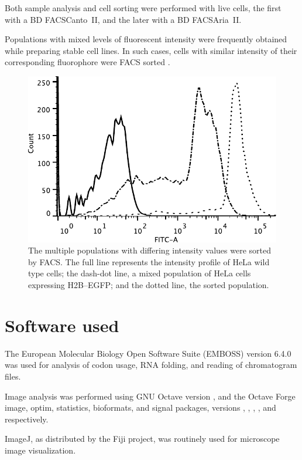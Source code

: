      Both sample analysis and cell sorting were performed with live cells, the
      first with a BD FACSCanto~II, and the later with a BD FACSAria~II.

      Populations with mixed levels of fluorescent intensity were
      frequently obtained while preparing stable cell lines. In such
      cases, cells with similar intensity of their corresponding
      fluorophore were FACS sorted .

      \begin{figure}
        \centering
        \includegraphics[width=\textwidth]{figs/facs-stable-cell-lines.pdf}
                     { The multiple populations with differing
                       intensity values were sorted by FACS. The full
                       line represents the intensity profile of HeLa
                       wild type cells; the dash-dot line, a mixed
                       population of HeLa cells expressing H2B--EGFP;
                       and the dotted line, the sorted population.  }
        \label{fig:methods:facs}
      \end{figure}

  \section{Software used}
    \label{sec:methods:software}
    The European Molecular Biology Open Software Suite (EMBOSS) version 6.4.0
    was used for analysis of codon usage, RNA folding, and reading of
    chromatogram files.

    Image analysis was performed using GNU Octave version \OctaveVersion{},
    and the Octave Forge image, optim, statistics, bioformats, and signal
    packages, versions \OctaveImageVersion{}, \OctaveOptimVersion{},
    \OctaveStatisticsVersion{}, \OctaveBioformatsVersion{}, and
    \OctaveSignalVersion{} respectively.

    ImageJ, as distributed by the Fiji project, was routinely used
    for microscope image visualization.
